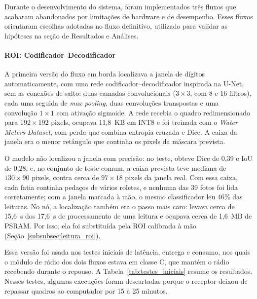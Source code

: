 Durante o desenvolvimento do sistema, foram implementados três fluxos que acabaram
abandonados por limitações de hardware e de desempenho. Esses fluxos orientaram escolhas
adotadas no fluxo definitivo, utilizado para validar as hipóteses na seção de Resultados e
Análises.

\paragraph{ROI: Codificador--Decodificador}
\label{par:fluxo_localizacao}
\label{subsubsec:segmentacao}

A primeira versão do fluxo em borda localizava a janela de dígitos automaticamente, com uma
rede codificador--decodificador inspirada na U-Net, sem as conexões de salto: duas camadas
convolucionais ($3 \times 3$, com 8 e 16 filtros), cada uma seguida de \textit{max
pooling}, duas convoluções transpostas e uma convolução $1 \times 1$ com ativação sigmoide.
A rede recebia o quadro redimensionado para $192 \times 192$ pixels, ocupava 11,8~KB em
INT8 e foi treinada com o \textit{Water Meters Dataset}, com perda que combina entropia
cruzada e Dice. A caixa da janela era o menor retângulo que continha os pixels da máscara
prevista.

O modelo não localizou a janela com precisão: no teste, obteve Dice de 0,39 e IoU de 0,28,
e, no conjunto de teste comum, a caixa prevista teve mediana de $130 \times 90$ pixels,
contra cerca de $97 \times 18$ pixels da janela real. Com essa caixa, cada fatia continha
pedaços de vários roletes, e nenhuma das 39 fotos foi lida corretamente; com a janela
marcada à mão, o mesmo classificador leu 46\% das leituras. No nó, a localização também era
o passo mais caro: levava cerca de 15,6~s dos 17,6~s de processamento de uma leitura e
ocupava cerca de 1,6~MB de PSRAM. Por isso, ela foi substituída pela ROI calibrada à mão
(Seção~\ref{subsubsec:leitura_roi}).

Essa versão foi usada nos testes iniciais de latência, entrega e consumo, nos quais o módulo
de rádio dos dois fluxos estava em classe C, que mantém o rádio recebendo durante o repouso.
A Tabela~\ref{tab:testes_iniciais} resume os resultados. Nesses testes, algumas execuções
foram descartadas porque o receptor deixou de repassar quadros ao computador por 15 a 25
minutos.

